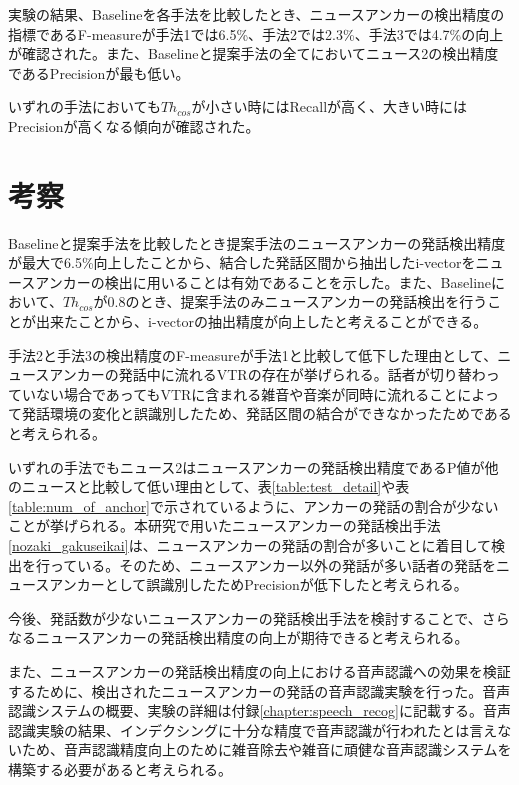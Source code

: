 実験の結果、Baselineを各手法を比較したとき、ニュースアンカーの検出精度の指標であるF-measureが手法1では6.5\%、手法2では2.3\%、手法3では4.7\%の向上が確認された。また、Baselineと提案手法の全てにおいてニュース2の検出精度であるPrecisionが最も低い。\par
いずれの手法においても$Th_{cos}$が小さい時にはRecallが高く、大きい時にはPrecisionが高くなる傾向が確認された。\par

\section{考察}
Baselineと提案手法を比較したとき提案手法のニュースアンカーの発話検出精度が最大で6.5\%向上したことから、結合した発話区間から抽出したi-vectorをニュースアンカーの検出に用いることは有効であることを示した。また、Baselineにおいて、$Th_{cos}$が0.8のとき、提案手法のみニュースアンカーの発話検出を行うことが出来たことから、i-vectorの抽出精度が向上したと考えることができる。\par
手法2と手法3の検出精度のF-measureが手法1と比較して低下した理由として、ニュースアンカーの発話中に流れるVTRの存在が挙げられる。話者が切り替わっていない場合であってもVTRに含まれる雑音や音楽が同時に流れることによって発話環境の変化と誤識別したため、発話区間の結合ができなかったためであると考えられる。\par
いずれの手法でもニュース2はニュースアンカーの発話検出精度であるP値が他のニュースと比較して低い理由として、表\ref{table:test_detail}や表\ref{table:num_of_anchor}で示されているように、アンカーの発話の割合が少ないことが挙げられる。本研究で用いたニュースアンカーの発話検出手法\ref{nozaki_gakuseikai}は、ニュースアンカーの発話の割合が多いことに着目して検出を行っている。そのため、ニュースアンカー以外の発話が多い話者の発話をニュースアンカーとして誤識別したためPrecisionが低下したと考えられる。\par
今後、発話数が少ないニュースアンカーの発話検出手法を検討することで、さらなるニュースアンカーの発話検出精度の向上が期待できると考えられる。\par
また、ニュースアンカーの発話検出精度の向上における音声認識への効果を検証するために、検出されたニュースアンカーの発話の音声認識実験を行った。音声認識システムの概要、実験の詳細は付録\ref{chapter:speech_recog}に記載する。音声認識実験の結果、インデクシングに十分な精度で音声認識が行われたとは言えないため、音声認識精度向上のために雑音除去や雑音に頑健な音声認識システムを構築する必要があると考えられる。